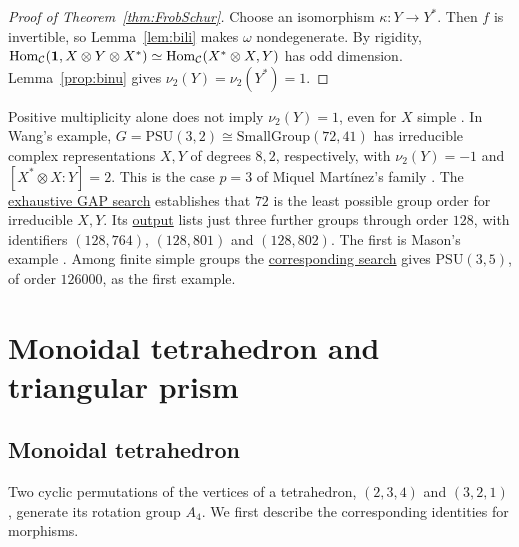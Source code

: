 \documentclass{amsart}
\begin{document}
\begin{proof}[Proof of Theorem~\ref{thm:FrobSchur}]
Choose an isomorphism $\kappa:Y\to Y^*$. Then $f$ is invertible, so
Lemma~\ref{lem:bili} makes $\omega$ nondegenerate. By rigidity,
$\mathrm{Hom}_{\mathcal{C}}({\bf 1},X\otimes Y\otimes X^*)\simeq\mathrm{Hom}_{\mathcal{C}}(X^*\otimes X,Y)$ has odd
dimension. Lemma~\ref{prop:binu} gives $\nu_2(Y)=\nu_2(Y^*)=1$.
\end{proof}

\begin{remark}\label{rk:WangCounter}
Positive multiplicity alone does not imply $\nu_2(Y)=1$, even for $X$ simple \cite{Mas,yilong}. In Wang's example, $G=\mathrm{PSU}(3,2)\cong\mathrm{SmallGroup}(72,41)$ has irreducible complex representations $X,Y$ of degrees $8,2$, respectively, with $\nu_2(Y)=-1$ and $[X^*\otimes X:Y]=2$. This is the case $p=3$ of Miquel Mart\'inez's family \cite[Theorem~A]{MiqMar}. The \href{https://github.com/sebastienpalcoux/triangular-prism-categorification/blob/f816c697fde088b261e1fe1ce703980e5dbdab51/optional/check_small_groups.g}{exhaustive GAP search} establishes that $72$ is the least possible group order for irreducible $X,Y$. Its \href{https://github.com/sebastienpalcoux/triangular-prism-categorification/blob/f816c697fde088b261e1fe1ce703980e5dbdab51/certificates/small-groups-output.txt}{output} lists just three further groups through order $128$, with identifiers $(128,764)$, $(128,801)$ and $(128,802)$. The first is Mason's example \cite{Mas}. Among finite simple groups the \href{https://github.com/sebastienpalcoux/triangular-prism-categorification/blob/f816c697fde088b261e1fe1ce703980e5dbdab51/optional/check_simple_groups.g}{corresponding search} gives $\mathrm{PSU}(3,5)$, of order $126000$, as the first example.
\end{remark}
\section{Monoidal tetrahedron and triangular prism}
\subsection{Monoidal tetrahedron} \label{sec:monotetra}
Two cyclic permutations of the vertices of a tetrahedron, $(2,3,4)$ and $(3,2,1)$, generate its rotation group $A_4$. We first describe the corresponding identities for morphisms.
\end{document}
